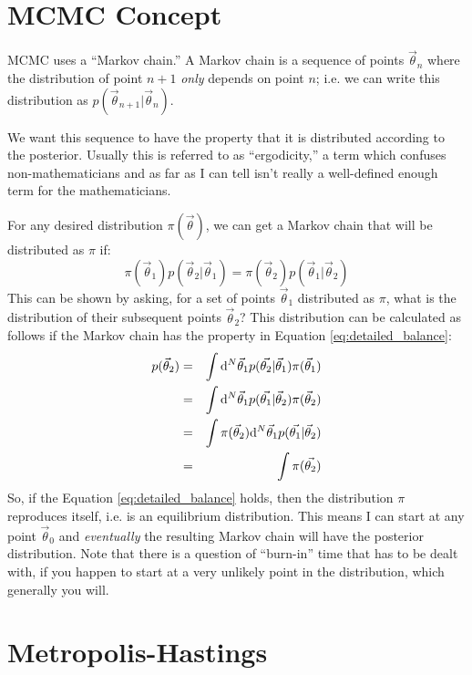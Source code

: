 \section{MCMC Concept}

MCMC uses a ``Markov chain.'' A Markov chain is a sequence of points
$\vec{\theta}_n$ where the distribution of point $n+1$ {\it only}
depends on point $n$; i.e. we can write this distribution as
$p(\vec{\theta}_{n+1} | \vec{\theta}_n)$.

We want this sequence to have the property that it is distributed
according to the posterior. Usually this is referred to as
``ergodicity,'' a term which confuses non-mathematicians and as far as
I can tell isn't really a well-defined enough term for the
mathematicians.

For any desired distribution $\pi(\vec{\theta})$, we can get a Markov
chain that will be distributed as $\pi$ if:
\begin{equation}
\label{eq:detailed_balance}
\pi(\vec{\theta}_1)
p(\vec{\theta}_2 | \vec{\theta}_1) = 
\pi(\vec{\theta}_2)
p(\vec{\theta}_1 | \vec{\theta}_2)
\end{equation}
This can be shown by asking, for a set of points $\vec{\theta}_1$
distributed as $\pi$, what is the distribution of their subsequent
points $\vec{\theta}_2$?
This distribution can be calculated as follows if the Markov chain has
the property in Equation \ref{eq:detailed_balance}:
\begin{eqnarray}
  p(\vec{\theta}_2) &=&
  \int {\rm d}^N\vec{\theta}_1 p(\vec{\theta_2} | \vec{\theta}_1)
  \pi(\vec{\theta}_1) \cr
  &=&
  \int {\rm d}^N\vec{\theta}_1 p(\vec{\theta_1} | \vec{\theta}_2)
  \pi(\vec{\theta}_2) \cr
  &=&
  \int \pi(\vec{\theta}_2) {\rm d}^N\vec{\theta}_1 p(\vec{\theta_1} |
  \vec{\theta}_2) \cr
  &=&
  \int \pi(\vec{\theta_2}) 
\end{eqnarray}
So, if the Equation \ref{eq:detailed_balance} holds, then the
distribution $\pi$ reproduces itself, i.e. is an equilibrium
distribution. This means I can start at any point $\vec{\theta}_0$ and
{\it eventually} the resulting Markov chain will have the posterior
distribution. Note that there is a question of ``burn-in'' time that
has to be dealt with, if you happen to start at a very unlikely point
in the distribution, which generally you will.

\section{Metropolis-Hastings}

